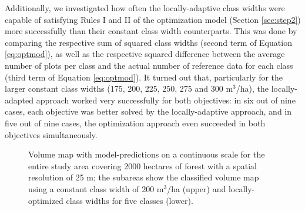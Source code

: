Additionally, we investigated how often the locally-adaptive class widths were capable of satisfying Rules I and II of the optimization model (Section \ref{sec:step2}) more successfully than their constant class width counterparts. This was done by comparing the respective sum of squared class widths (second term of Equation \ref{eq:optmod}), as well as the respective squared difference between the average number of plots per class and the actual number of reference data for each class (third term of Equation \ref{eq:optmod}). It turned out that, particularly for the larger constant class widths (175, 200, 225, 250, 275 and 300 m$^3$/ha), the locally-adapted approach worked very successfully for both objectives: in six out of nine cases, each objective was better solved by the locally-adaptive approach, and in five out of nine cases, the optimization approach even succeeded in both objectives simultaneously.

\begin{figure}[H]
	\centering
	\caption{Volume map with model-predictions on a continuous scale for the entire study area covering 2000 hectares of forest with a spatial resolution of 25 m; the subareas show the classified volume map using a constant class width of 200 m$^3$/ha (upper) and locally-optimized class widths for five classes (lower).}
	\label{fig:volmap}
\end{figure}


